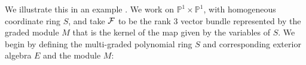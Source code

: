\documentclass[twoside,12pt, leqno]{amsart}
\def\PP{{\mathbb P}}
\def\cornerT#1{{T_{\Rsh \kern -1pt #1}}}
\def\bT{{\bf T}}
\begin{document}
We illustrate this in an example . We work on 
$\PP^1\times \PP^1$, with homogeneous coordinate ring $S$, and take
${\mathcal F}$ to be the rank $3$ vector bundle represented by the graded module
$M$ that is the kernel of the map given by the variables of $S$.
We begin by defining the multi-graded polynomial ring $S$ and corresponding exterior algebra $E$ 
and the module $M$:
\end{document}
